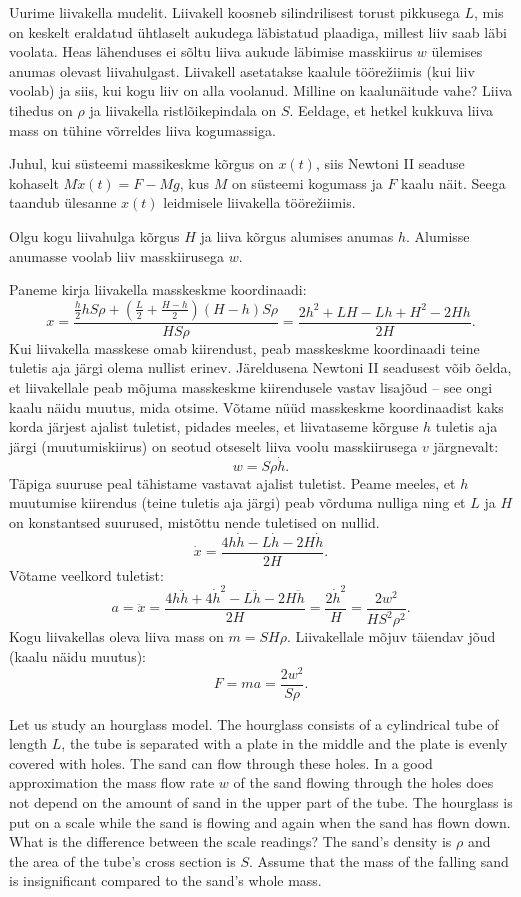 
Uurime liivakella mudelit. Liivakell koosneb silindrilisest torust pikkusega
$L$, mis on keskelt eraldatud ühtlaselt aukudega läbistatud plaadiga, millest
liiv saab läbi voolata. Heas lähenduses ei sõltu liiva aukude läbimise
masskiirus $w$ ülemises anumas olevast liivahulgast. Liivakell asetatakse
kaalule töörežiimis (kui liiv voolab) ja siis, kui kogu liiv on alla voolanud.
Milline on kaalunäitude vahe? Liiva tihedus on $\rho$ ja liivakella
ristlõikepindala on $S$. Eeldage, et hetkel kukkuva liiva mass on tühine
võrreldes liiva kogumassiga.

\hint
Juhul, kui süsteemi massikeskme kõrgus on $x(t)$, siis Newtoni II seaduse kohaselt $M\ddot{x}(t) = F - Mg$, kus $M$ on süsteemi kogumass ja $F$ kaalu näit. Seega taandub ülesanne $x(t)$ leidmisele liivakella töörežiimis.

\solu
Olgu kogu liivahulga kõrgus $H$ ja liiva kõrgus alumises anumas $h$. Alumisse anumasse voolab liiv masskiirusega $w$. 


Paneme kirja liivakella masskeskme koordinaadi:
\[x=\frac{\frac{h}{2}hS\rho+(\frac{L}{2}+\frac{H-h}{2})(H-h)S\rho}{HS\rho}=\frac{2h^2+LH-Lh+H^2-2Hh}{2H}.\] 
Kui liivakella masskese omab kiirendust, peab masskeskme koordinaadi teine tuletis aja järgi olema nullist erinev. Järeldusena Newtoni II seadusest võib õelda, et liivakellale peab mõjuma masskeskme kiirendusele vastav lisajõud -- see ongi kaalu näidu muutus, mida otsime.
Võtame nüüd masskeskme koordinaadist kaks korda järjest ajalist tuletist, pidades meeles, et liivataseme kõrguse $h$ tuletis aja järgi (muutumiskiirus) on seotud otseselt liiva voolu masskiirusega $v$ järgnevalt:
\[w=S\rho\dot{h}.\]
Täpiga suuruse peal tähistame vastavat ajalist tuletist. Peame meeles, et $h$ muutumise kiirendus (teine tuletis aja järgi) peab võrduma nulliga ning et $L$ ja $H$ on konstantsed suurused, mistõttu nende tuletised on nullid.
\[\dot{x}=\frac{4h\dot{h}-L\dot{h}-2H\dot{h}}{2H}.\]
Võtame veelkord tuletist:
\[a=\ddot{x}=\frac{4h\ddot{h}+4\dot{h}^2-L\ddot{h}-2H\ddot{h}}{2H}=\frac{2\dot{h}^2}{H}=\frac{2w^2}{HS^2\rho^2}.\]
Kogu liivakellas oleva liiva mass on $m=SH\rho$.
Liivakellale mõjuv täiendav jõud (kaalu näidu muutus):
\[F=ma=\frac{2w^2}{S\rho}.\]

Let us study an hourglass model. The hourglass consists of a cylindrical tube of length $L$, the tube is separated with a plate in the middle and the plate is evenly covered with holes. The sand can flow through these holes. In a good approximation the mass flow rate $w$ of the sand flowing through the holes does not depend on the amount of sand in the upper part of the tube. The hourglass is put on a scale while the sand is flowing and again when the sand has flown down. What is the difference between the scale readings? The sand’s density is $\rho$ and the area of the tube’s cross section is $S$. Assume that the mass of the falling sand is insignificant compared to the sand’s whole mass.

